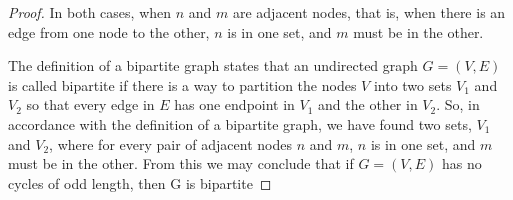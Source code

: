 \documentclass[10pt,letter]{article}
\begin{document}
\begin{enumerate}
\begin{proof}
In both cases, when $n$ and $m$ are adjacent nodes, that is, when there is an edge from one node to the other, $n$ is in one set, and $m$ must be in the other. 

The definition of a bipartite graph states that an undirected graph $G = (V, E)$ is called bipartite if there is a way to partition the nodes $V$ into two sets $V_1$ and $V_2$ so that every edge in $E$ has one endpoint in $V_1$ and the other in $V_2$. So, in accordance with the definition of a bipartite graph, we have found two sets, $V_1$ and $V_2$, where for every pair of adjacent nodes $n$ and $m$, $n$ is in one set, and $m$ must be in the other. From this we may conclude that if $G = (V, E)$ has no cycles of odd length, then G is bipartite

\end{proof}

\end{enumerate}








\end{document}
